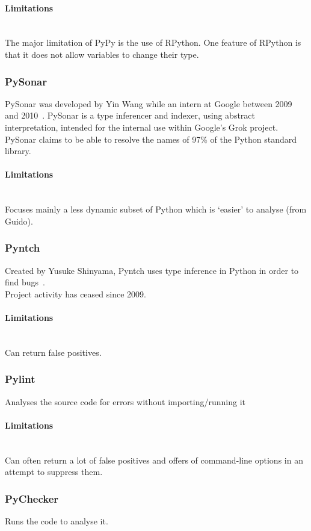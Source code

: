 \documentclass[12pt, titlepage]{article}
\begin{document}
\paragraph{Limitations}\mbox{}\\
The major limitation of PyPy is the use of RPython. One feature of RPython is that it does not allow variables to change their type.

\subsubsection{PySonar}
PySonar was developed by Yin Wang while an intern at Google between 2009 and 2010~\cite{pySonar}. PySonar is a type inferencer and indexer, using abstract interpretation, intended for the internal use within Google's Grok project. PySonar claims to be able to resolve the names of 97\% of the Python standard library.
\paragraph{Limitations}\mbox{}\\
Focuses mainly a less dynamic subset of Python which is `easier' to analyse (from Guido).

\subsubsection{Pyntch}
Created by Yusuke Shinyama, Pyntch uses type inference in Python in order to find bugs~\cite{pyntch}. \\
Project activity has ceased since 2009.
\paragraph{Limitations}\mbox{}\\
Can return false positives.

\subsubsection{Pylint}
Analyses the source code for errors without importing/running it
\paragraph{Limitations}\mbox{}\\
Can often return a lot of false positives and offers of command-line options in an attempt to suppress them.

\subsubsection{PyChecker}
Runs the code to analyse it.
\end{document}

